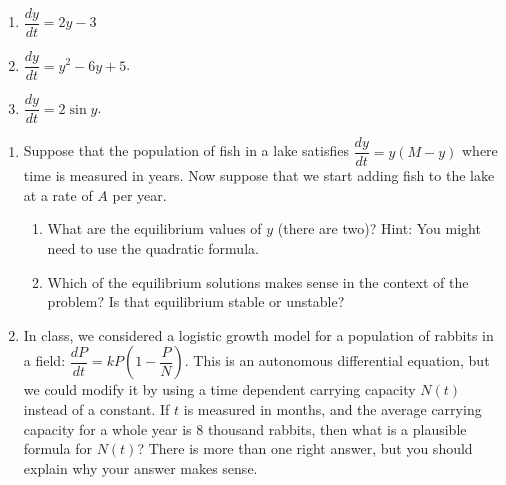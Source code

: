 \documentclass[10pt]{article}
\begin{document}
\begin{multicols}{3}
\begin{enumerate}
\setcounter{enumi}{\theenumCount}
\item $\dfrac{dy}{dt} = 2y - 3$


\item $\dfrac{dy}{dt} = y^2 - 6y + 5$.

\item $\dfrac{dy}{dt} = 2 \sin y$. 

\setcounter{enumCount}{\theenumi}
\end{enumerate} 
\end{multicols}

\vfill

\begin{enumerate}
\setcounter{enumi}{\theenumCount}
\item Suppose that the population of fish in a lake satisfies $\dfrac{dy}{dt} = y(M-y)$ where time is measured in years.  Now suppose that we start adding fish to the lake at a rate of $A$ per year.  
\begin{enumerate}
\item What are the equilibrium values of $y$ (there are two)? Hint: You might need to use the quadratic formula. 
\vfill

\item Which of the equilibrium solutions makes sense in the context of the problem?  Is that equilibrium stable or unstable? 
\vfill
\end{enumerate}

\item In class, we considered a logistic growth model for a population of rabbits in a field: $\dfrac{dP}{dt} = k P \left( 1 - \dfrac{P}{N} \right).$
This is an autonomous differential equation, but we could modify it by using a time dependent carrying capacity $N(t)$ instead of a constant.  If $t$ is measured in months, and the average carrying capacity for a whole year is $8$ thousand rabbits, then what is a plausible formula for $N(t)$?  There is more than one right answer, but you should explain why your answer makes sense.  
\vfill


\end{enumerate}
\end{document}
